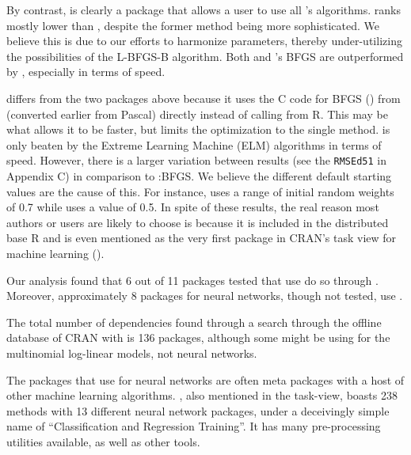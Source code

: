 By contrast,  is clearly a package that allows a user to
use all 's algorithms.  ranks
mostly lower than , despite the former method
being more sophisticated. We believe this is due to our efforts to
harmonize parameters, thereby under-utilizing the possibilities of the
L-BFGS-B algorithm. Both  and 's BFGS are
outperformed by , especially in terms of speed.

 \citep{R-nnet} differs from the two packages above because it
uses the C code for BFGS () from  (converted
earlier from Pascal) directly instead of calling  from R.
This may be what allows it to be faster, but limits the optimization to
the single method.  is only beaten by the Extreme Learning
Machine (ELM) algorithms in terms of speed. However, there is a larger
variation between results (see the \texttt{RMSEd51} in Appendix C) in
comparison to :BFGS. We believe the different default
starting values are the cause of this. For instance,  uses a
range of initial random weights of 0.7 while  uses a value
of 0.5. In spite of these results, the real reason most authors or users
are likely to choose  is because it is included in the
distributed base R and is even mentioned as the very first package in
CRAN's task view for machine learning ().

Our analysis found that 6 out of 11 packages tested that use
 do so through . Moreover, approximately 8
packages for neural networks, though not tested, use .

The total number of  dependencies found through a search
through the offline database of CRAN with  is 136
packages, although some might be using  for the multinomial
log-linear models, not neural networks.

The packages that use  for neural networks are often meta
packages with a host of other machine learning algorithms. 
\citep{R-caret}, also mentioned in the task-view, boasts 238 methods
with 13 different neural network packages, under a deceivingly simple
name of ``Classification and Regression Training''. It has many
pre-processing utilities available, as well as other tools.

